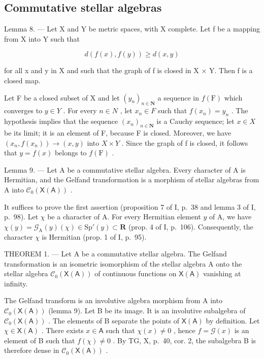 \subsection{Commutative stellar algebras}

Lemma 8. --- Let X and Y be metric spaces, with X complete. Let f be a mapping from X into Y such that

\[
d (f (x), f (y)) \geqslant d (x, y)
\]

for all x and y in X and such that the graph of f is closed in X × Y. Then f is a closed map.

Let F be a closed subset of X and let \((y_{n})_{n\in\mathbf{N}}\) a sequence in \(f(\mathrm{F})\) which converges to \(y\in Y\) . For every \(n\in N\) , let \(x_{n}\in F\) such that \(f(x_{n})=y_{n}\) . The hypothesis implies that the sequence \((x_{n})_{n\in\mathbf{N}}\) is a Cauchy sequence; let \(x\in X\) be its limit; it is an element of F, because F is closed. Moreover, we have \((x_{n},f(x_{n}))\to(x,y)\) into \(X\times Y\) . Since the graph of f is closed, it follows that \(y=f(x)\) belongs to \(f(\mathrm{F})\) .

Lemma 9. --- Let A be a commutative stellar algebra. Every character of A is Hermitian, and the Gelfand transformation is a morphism of stellar algebras from A into \(\mathcal{C}_{0}(\mathsf{X}(\mathsf{A}))\) .

It suffices to prove the first assertion (proposition 7 of I, p.~38 and lemma 3 of I, p.~98). Let \(\chi\) be a character of A. For every Hermitian element \(y\) of A, we have \(\chi(y) = \mathcal{G}_{\mathrm{A}}(y)(\chi) \in \mathrm{Sp}'(y) \subset \mathbf{R}\) (prop. 4 of I, p.~106). Consequently, the character \(\chi\) is Hermitian (prop. 1 of I, p.~95).

THEOREM 1. --- Let A be a commutative stellar algebra. The Gelfand transformation is an isometric isomorphism of the stellar algebra A onto the stellar algebra \(\mathcal{C}_{0}(\mathsf{X}(\mathsf{A}))\) of continuous functions on \(\mathsf{X}(\mathsf{A})\) vanishing at infinity.

The Gelfand transform is an involutive algebra morphism from A into \(\mathcal{C}_{0}(\mathsf{X}(\mathsf{A}))\) (lemma 9). Let B be its image. It is an involutive subalgebra of \(\mathcal{C}_{0}(\mathsf{X}(\mathsf{A}))\) . The elements of B separate the points of \(\mathsf{X}(\mathsf{A})\) by definition. Let \(\chi \in \mathsf{X}(\mathsf{A})\) . There exists \(x \in \mathsf{A}\) such that \(\chi(x) \neq 0\) , hence \(f = \mathcal{G}(x)\) is an element of B such that \(f(\chi) \neq 0\) . By TG, X, p.~40, cor. 2, the subalgebra B is therefore dense in \(\mathcal{C}_{0}(\mathsf{X}(\mathsf{A}))\) .

